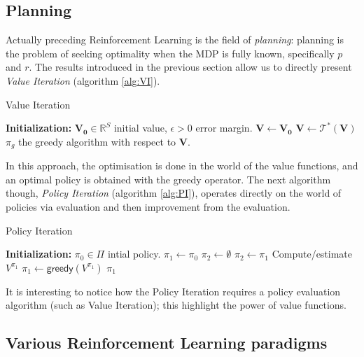 \subsection{Planning}
\label{subsec:RL-planning}

Actually preceding Reinforcement Learning is the field of \emph{planning}: planning is the problem of seeking optimality when the MDP is fully known, specifically $p$ and $r$. The results introduced in the previous section allow us to directly present \emph{Value Iteration} (algorithm \ref{alg:VI}).

\begin{algorithm}[htbp]
\small
\caption{Value Iteration}
\label{alg:VI}
\begin{algorithmic}
\State \textbf{Initialization:} $\mathbf{V_0} \in \mathbb{R}^S$ initial value, $\epsilon > 0$ error margin.
\State $\mathbf{V} \leftarrow \mathbf{V_0}$
\State $\mathbf{V} \leftarrow \mathcal{T}^*(\mathbf{V})$
\EndWhile\State
\Return $\pi_g$ the greedy algorithm with respect to $\mathbf{V}$.
\end{algorithmic}
\normalsize
\end{algorithm}

In this approach, the optimisation is done in the world of the value functions, and an optimal policy is obtained with the greedy operator. The next algorithm though, \emph{Policy Iteration} (algorithm \ref{alg:PI}), operates directly on the world of policies via evaluation and then improvement from the evaluation.

\begin{algorithm}[htbp]
\small
\caption{Policy Iteration}
\label{alg:PI}
\begin{algorithmic}
\State \textbf{Initialization:} $\pi_0 \in \Pi$ intial policy.
\State $\pi_1 \leftarrow \pi_0$
\State $\pi_2 \leftarrow \emptyset$
\State $\pi_2 \leftarrow \pi_1$
\State Compute/estimate $V^{\pi_1}$ 
\State $\pi_1 \leftarrow \mathsf{greedy}(V^{\pi_1})$ 
\EndWhile\State
\Return $\pi_1$
\end{algorithmic}
\normalsize
\end{algorithm}


It is interesting to notice how the Policy Iteration requires a policy evaluation algorithm (such as Value Iteration); this highlight the power of value functions.

\subsection{Various Reinforcement Learning paradigms}
\label{subsec:RL-paradigms}

